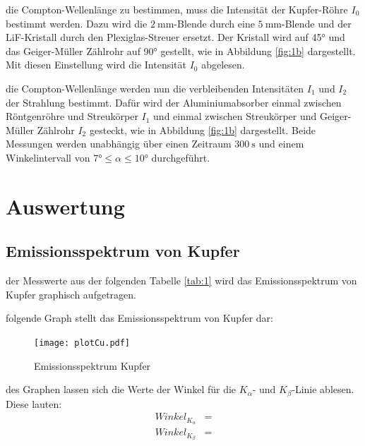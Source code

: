     \justifying die Compton-Wellenlänge zu bestimmen, muss die Intensität der Kupfer-Röhre $I_0$ bestimmt werden. Dazu wird die $\SI{2}{\milli\meter}$-Blende
    durch eine $\SI{5}{\milli\meter}$-Blende und der LiF-Kristall durch den Plexiglas-Streuer ersetzt. Der Kristall wird auf 45° und das Geiger-Müller Zählrohr auf 90° gestellt, 
    wie in Abbildung \ref{fig:1b} dargestellt. Mit diesen Einstellung wird die Intensität $I_0$ abgelesen.

    \justifying die Compton-Wellenlänge werden nun die verbleibenden Intensitäten $I_1$ und $I_2$ der Strahlung bestimmt. Dafür wird der Aluminiumabsorber 
    einmal zwischen Röntgenröhre und Streukörper $I_1$ und einmal zwischen Streukörper und Geiger-Müller Zählrohr $I_2$ gesteckt, wie in Abbildung \ref{fig:1b} dargestellt. 
    Beide Messungen werden unabhängig über einen Zeitraum $\SI{300}{\second}$ und einem Winkelintervall von $7° \leq \alpha \leq 10°$ durchgeführt. 


\newpage
\section{Auswertung}

    \subsection{Emissionsspektrum von Kupfer}

    \justifying der Messwerte aus der folgenden Tabelle \ref{tab:1} wird das Emissionsspektrum von Kupfer graphisch aufgetragen.

    

    \newpage
    \justifying folgende Graph stellt das Emissionsspektrum von Kupfer dar:

    \begin{figure}[H]
        \centering
        \texttt{[image: plotCu.pdf]}
        \caption{Emissionsspektrum Kupfer}
        \label{fig:2}
    \end{figure}

    \justifying des Graphen lassen sich die Werte der Winkel für die $K_{\alpha}$- und $K_{\beta}$-Linie ablesen. Diese lauten:
    \begin{align}
        Winkel_{K_{\alpha}} &= \text{}  \label{eq:5}\\
        Winkel_{K_{\beta}}  &= \text{} \label{eq:6}
    \end{align}

